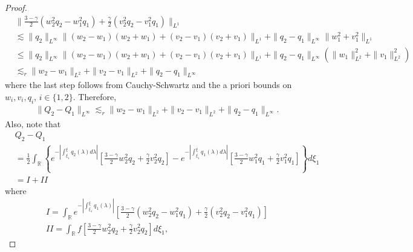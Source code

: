 \documentclass[12pt,reqno]{amsart}
\numberwithin{equation}{section}  %
\numberwithin{figure}{section}
\newcommand{\rr}{\mathbb{R}}
\begin{document}
\begin{proof}
\begin{equation}
  \label{q-init-bound}
  \begin{split}
  & \| \frac{3 - \gamma}{2} (w_{2}^{2} q_{2} - w_{1}^{2} q_{1}) +
  \frac{\gamma}{2}(v_{2}^{2}q_{2} - v_{1}^{2}q_{1}) \|_{L^{1}}
  \\
  & \lesssim \| q_{2} \|_{L^{\infty}} \| (w_{2} - w_{1})(w_{2} + w_{1})
  + (v_{2} - v_{1})(v_{2} + v_{1}) \|_{L^{1}}
  + \| q_{2} - q_{1} \|_{L^{\infty}} \| w_{1}^{2} + v_{1}^{2}\|_{L^{1}} 
  \\
  & \le \| q_{2} \|_{L^{\infty}} \| (w_{2} - w_{1})(w_{2} + w_{1})
  + (v_{2} - v_{1})(v_{2} + v_{1}) \|_{L^{1}}
  + \| q_{2} - q_{1} \|_{L^{\infty}} (\| w_{1}\|_{L^{2}}^{2} + \|
  v_{1}\|_{L^{2}}^{2}) 
  \\
  & \lesssim_{r} \| w_{2} - w_{1} \|_{L^{2}} + \| v_{2} - v_{1} \|_{L^{2}} + \| q_{2} - q_{1} \|_{L^{\infty}}
\end{split}
\end{equation}
where the last step follows from Cauchy-Schwartz and the a priori bounds
on $w_{i}, v_{i}, q_{i}$, $i \in \{1,2\}$. Therefore, 
%
%
\begin{equation}
  \label{pi}
\begin{split}
  \| Q_{2} - Q_{1} \|_{L^{\infty}} \lesssim_{r}\| w_{2} -w_{1} \|_{L^{2}} + \| v_{2} - v_{1} \|_{L^{2}} + \| q_{2} - q_{1} \|_{L^{\infty}}.
\end{split}
\end{equation}
%
%
Also, note that
%
%
%
%
\begin{equation}
  \label{I-II-split}
\begin{split}
  & Q_{2} - Q_{1}
  \\
  & = \frac{1}{2} \int_{\rr} \left\{ e^{-| \int_{\xi_{1}}^{\xi}
  q_{2}(\lambda) d \lambda|}\left[ \frac{3 - \gamma}{2} w_{2}^{2} q_{2} +
    \frac{\gamma}{2} v_{2}^{2} q_{2} \right] - e^{-| \int_{\xi_{1}}^{\xi}
    q_{1}(\lambda) d \lambda |} \left[ \frac{3 - \gamma}{2} w_{1}^{2}
      q_{1} + \frac{\gamma}{2} v_{1}^{2} q_{1} \right] \right\} d \xi_{1}
      \\
      & = I + II
\end{split}
\end{equation}
%
%
where
\begin{gather*}
  I = \int_{\rr} e^{-| \int_{\xi_{1}}^{\xi} q_{1}(\lambda) |} \left[ \frac{3-
  \gamma}{2}(w_{2}^{2} q_{2} - w_{1}^{2} q_{1}) +
  \frac{\gamma}{2}(v_{2}^{2} q_{2} - v_{1}^{2} q_{1}) \right]
  \\
  II = \int_{\rr} f\left[ \frac{3-\gamma}{2}w_{2}^{2}q_{2} + \frac{\gamma}{2}
    v_{2}^{2} q_{2} \right]d \xi_{1}, \quad

\end{gather*}
\end{proof}
\end{document}
